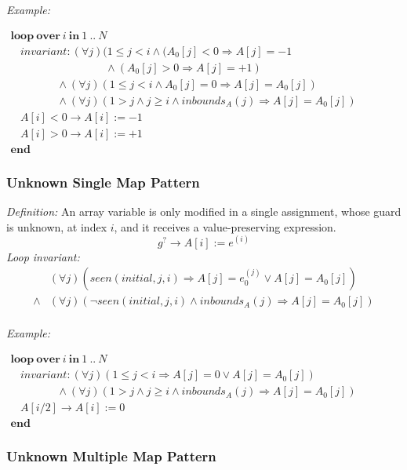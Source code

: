\documentclass[a4paper,10pt]{article}
\newcommand{\idx}{\ensuremath{i}\xspace}
\newcommand{\idxinitial}{\ensuremath{\mathit{initial}}\xspace}
\newcommand{\KWloop}{\ensuremath{\mathrm{\textbf{loop}}~}}
\newcommand{\KWend}{\ensuremath{\mathrm{\textbf{end}}~}}
\newcommand{\KWover}{\ensuremath{\mathrm{\textbf{over}}~}}
\newcommand{\KWin}{\ensuremath{~\mathrm{\textbf{in}}~}}
\newcommand{\at}[1]{{(#1)}}
\newcommand{\impl}{\ensuremath{\Longrightarrow}}
\newcommand{\inbounds}[2]{\ensuremath{\mathit{inbounds}_{#1}(#2)}\xspace}
\newcommand{\seen}[3]{\ensuremath{\mathit{seen}{(#1,#2,#3)}}\xspace}
\newcommand{\loopinvariant}{\noindent\textit{Loop invariant:}\xspace}
\newcommand{\patterndef}{\noindent\textit{Definition:}\xspace}
\newcommand{\patternexample}{\noindent\textit{Example:}\xspace}
\begin{document}
\bigskip
\patternexample

\medskip
$\begin{array}{l}
  \KWloop \KWover i \KWin 1~..~N \\
  ~~~~ \textit{invariant}: (\forall j)(1 \leq j < i \land (A_0[j] < 0 \impl A[j] = -1\\
  ~~~~~~~~~~~~~~~~~~~~~~~~~~~~~~~~~~~~~~~ \land (A_0[j] > 0 \impl A[j] = +1)\\
  ~~~~~~~~~~~~~~~~~~~ \land (\forall j)(1 \leq j < i \land A_0[j] = 0 \impl A[j] = A_0[j])\\
  ~~~~~~~~~~~~~~~~~~~ \land (\forall j)(1 > j \land j \geq i \land \inbounds{A}{j} \impl A[j] = A_0[j])\\
  ~~~~ A[i] < 0 \rightarrow A[i] := -1\\
  ~~~~ A[i] > 0 \rightarrow A[i] := +1\\
  \KWend
\end{array}$

\subsubsection*{Unknown Single Map Pattern}

\patterndef An array variable is only modified in a single assignment, whose
guard is unknown, at index \idx, and it receives a value-preserving expression.
%
$$g^? \rightarrow A[\idx] := e^\at{\idx}$$
%
\loopinvariant
%
\begin{eqnarray*}
&(\forall j)(\seen{\idxinitial}{j}{\idx} \impl A[j] = e_0^\at{j} \lor A[j] = A_0[j]) \\
\land&
 (\forall j)(\neg \seen{\idxinitial}{j}{\idx} \land \inbounds{A}{j} \impl A[j] = A_0[j])\\
\end{eqnarray*}

\bigskip
\patternexample

\medskip
$\begin{array}{l}
  \KWloop \KWover i \KWin 1~..~N \\
  ~~~~ \textit{invariant}: (\forall j)(1 \leq j < i \impl A[j] = 0 \lor A[j]=A_0[j])\\
  ~~~~~~~~~~~~~~~~~~~ \land (\forall j)(1 > j \land j \geq i \land \inbounds{A}{j} \impl A[j] = A_0[j])\\
  ~~~~ A[i/2] \rightarrow A[i] := 0\\
  \KWend
\end{array}$

\subsubsection*{Unknown Multiple Map Pattern}
\end{document}
